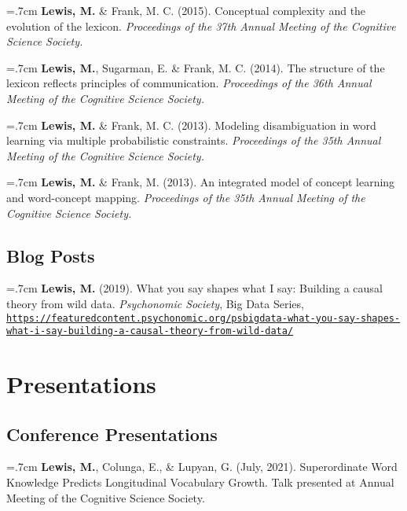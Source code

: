 \documentclass[letterpaper]{article}
\begin{document}
 \hangindent=.7cm {\bf Lewis, M.} \& Frank, M. C. (2015). Conceptual complexity and the evolution of the lexicon. { \it Proceedings of the 37th Annual Meeting of the Cognitive Science Society.}

 \hangindent=.7cm {\bf Lewis, M.}, Sugarman, E. \& Frank, M. C. (2014). The structure of the lexicon reflects principles of communication. { \it Proceedings of the 36th Annual Meeting of the Cognitive Science Society.}

 \hangindent=.7cm {\bf Lewis, M.} \& Frank, M. C. (2013). Modeling disambiguation in word learning via multiple probabilistic constraints. { \it Proceedings of the 35th Annual Meeting of the Cognitive Science Society.}

 \hangindent=.7cm {\bf Lewis, M.} \& Frank, M. (2013). An integrated model of concept learning and word-concept mapping.{ \it Proceedings of the 35th Annual Meeting of the Cognitive Science Society.}

  \subsection*{Blog Posts}
    \hangindent=.7cm {\bf Lewis, M.} (2019). What you say shapes what I say: Building a causal theory from wild data.  { \it Psychonomic Society}, Big Data Series, \href{https://featuredcontent.psychonomic.org/psbigdata-what-you-say-shapes-what-i-say-building-a-causal-theory-from-wild-data/}{\tt https://featuredcontent.psychonomic.org/psbigdata-what-you-say-{\newline}shapes-what-i-say-building-a-causal-theory-from-wild-data/}


 \singlespacing

\section*{Presentations}
\onehalfspacing

\subsection*{Conference Presentations}

 \hangindent=.7cm {\bf Lewis, M.}, Colunga, E., \& Lupyan, G. (July, 2021).  Superordinate Word Knowledge Predicts Longitudinal Vocabulary Growth.  Talk presented at Annual Meeting of the Cognitive Science Society.
\end{document}
